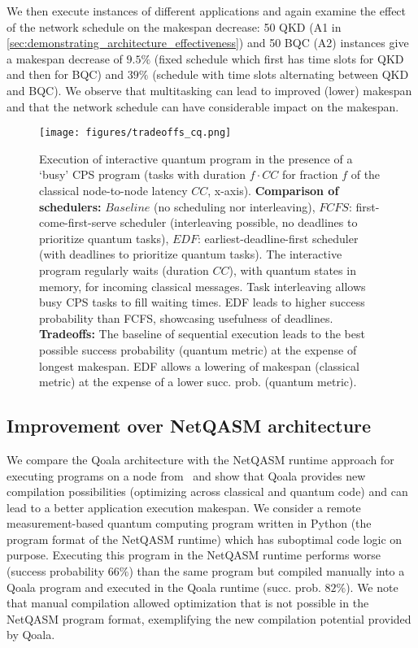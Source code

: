We then execute instances of different applications and again examine the effect of the network schedule on the makespan decrease: 50 QKD (A1 in \ref{sec:demonstrating_architecture_effectiveness}) and 50 BQC (A2) instances give a makespan decrease of $9.5\%$ (fixed schedule which first has time slots for QKD and then for BQC) and $39\%$ (schedule with time slots alternating between QKD and BQC).
We observe that multitasking can lead to improved (lower) makespan and that the network schedule can have considerable impact on the makespan.

\begin{figure}%
    \centering
    \texttt{[image: figures/tradeoffs\_cq.png]}
    \caption{Execution of interactive quantum program in the presence of a `busy' CPS program (tasks with duration $f \cdot CC$ for fraction $f$ of the classical node-to-node latency $CC$, x-axis).
    \textbf{Comparison of schedulers:}
    $Baseline$ (no scheduling nor interleaving),
    $FCFS$: first-come-first-serve scheduler (interleaving possible, no deadlines to prioritize quantum tasks),
    $EDF$: earliest-deadline-first scheduler (with deadlines to prioritize quantum tasks).
    The interactive program regularly waits (duration $CC$), with quantum states in memory, for incoming classical messages. %
    Task interleaving allows busy CPS tasks to fill waiting times.
    EDF leads to higher success probability than FCFS, showcasing usefulness of deadlines.
    \textbf{Tradeoffs:}
    The baseline of sequential execution leads to the best possible success probability (quantum metric) at the expense of longest makespan. EDF allows a lowering of makespan (classical metric) at the expense of a lower succ. prob. (quantum metric). 
    }
    \label{fig:eval_tradeoffs_cq}
\end{figure}

\subsection{Improvement over NetQASM architecture}
\label{sec:improvement_over_netqasm}
We compare the Qoala architecture with the NetQASM runtime approach for executing programs on a node from~\cite{dahlberg2022netqasm}
and show that Qoala provides new compilation possibilities (optimizing across classical and quantum code) and can lead to a better application execution makespan.
We consider a remote measurement-based quantum computing program written in Python (the program format of the NetQASM runtime) which has suboptimal code logic on purpose.
Executing this program in the NetQASM runtime performs worse (success probability $66\%$) than the same program but compiled manually into a Qoala program and executed in the Qoala runtime (succ. prob. $82\%$).
We note that manual compilation allowed optimization that is not possible in the NetQASM program format, exemplifying the new compilation potential provided by Qoala.

